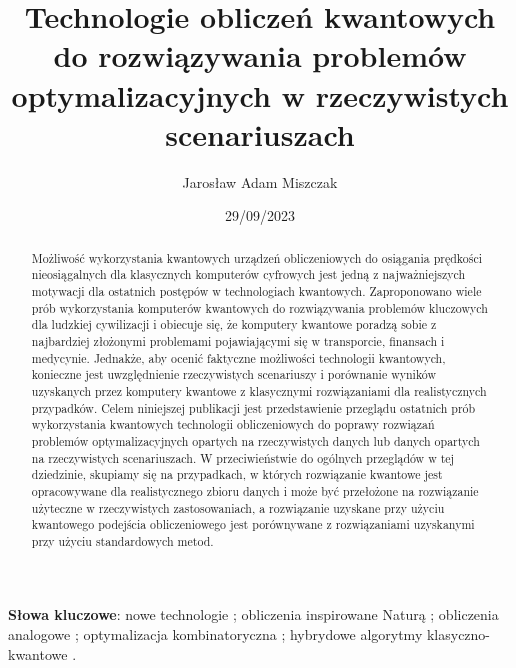 \documentclass[a4paper,11pt]{article}
\providecommand{\sep}{\!\!;\xspace}
\newenvironment{keyword}{\begin{flushleft}\textbf{Słowa kluczowe}:}{\!\!.\end{flushleft}}
\begin{document}

\title{Technologie obliczeń kwantowych do rozwiązywania problemów optymalizacyjnych w rzeczywistych scenariuszach}
\author{Jaros\l aw Adam Miszczak}
\date{29/09/2023}

\maketitle

\begin{abstract}
Możliwość wykorzystania kwantowych urządzeń obliczeniowych do osiągania prędkości nieosiągalnych dla klasycznych komputerów cyfrowych jest jedną z najważniejszych motywacji dla ostatnich postępów w technologiach kwantowych. Zaproponowano wiele prób wykorzystania komputerów kwantowych do rozwiązywania problemów kluczowych dla ludzkiej cywilizacji i obiecuje się, że komputery kwantowe poradzą sobie z najbardziej złożonymi problemami pojawiającymi się w transporcie, finansach i medycynie. Jednakże, aby ocenić faktyczne możliwości technologii kwantowych, konieczne jest uwzględnienie rzeczywistych scenariuszy i porównanie wyników uzyskanych przez komputery kwantowe z klasycznymi rozwiązaniami dla realistycznych przypadków. Celem niniejszej publikacji jest przedstawienie przeglądu ostatnich prób wykorzystania kwantowych technologii obliczeniowych do poprawy rozwiązań problemów optymalizacyjnych opartych na rzeczywistych danych lub danych opartych na rzeczywistych scenariuszach. W przeciwieństwie do ogólnych przeglądów w tej dziedzinie, skupiamy się na przypadkach, w których rozwiązanie kwantowe jest opracowywane dla realistycznego zbioru danych i może być przełożone na rozwiązanie użyteczne w rzeczywistych zastosowaniach, a rozwiązanie uzyskane przy użyciu kwantowego podejścia obliczeniowego jest porównywane z rozwiązaniami uzyskanymi przy użyciu standardowych metod.
\end{abstract}


\begin{keyword} 
nowe technologie \sep obliczenia inspirowane Naturą \sep obliczenia analogowe \sep optymalizacja kombinatoryczna \sep hybrydowe algorytmy klasyczno-kwantowe
\end{keyword}
\end{document}
